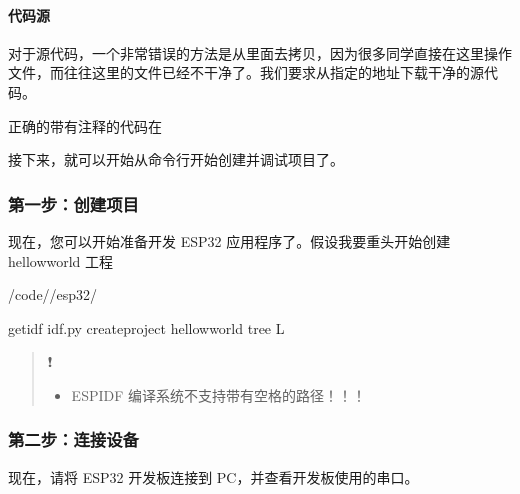 \documentclass[a4paper,12pt,english]{sphinxmanual}
\begin{document}
\paragraph{代码源}
\label{\detokenize{exp-esp32/ide/esp-idf-cli:id4}}
\sphinxAtStartPar
对于源代码，一个非常错误的方法是从里面去拷贝，因为很多同学直接在这里操作文件，而往往这里的文件已经不干净了。我们要求从指定的地址下载干净的源代码。

\sphinxAtStartPar
正确的带有注释的代码在 {\hyperref[\detokenize{reference::doc}]{}}

\sphinxAtStartPar
接下来，就可以开始从命令行开始创建并调试项目了。


\subsubsection{第一步：创建项目}
\label{\detokenize{exp-esp32/ide/esp-idf-cli:id5}}
\sphinxAtStartPar
现在，您可以开始准备开发 ESP32 应用程序了。假设我要重头开始创建 hellow\sphinxhyphen{}world 工程

\begin{sphinxVerbatim}[commandchars=\\\{\}]
 \PYGZti{}/code//esp32/

get\PYGZhy{}idf
idf.py create\PYGZhy{}project hellow\PYGZhy{}world
tree \PYGZhy{}L 
\end{sphinxVerbatim}
\begin{quote}

\sphinxAtStartPar
❗
\begin{itemize}
\item {} 
\sphinxAtStartPar
ESP\sphinxhyphen{}IDF 编译系统不支持带有空格的路径！！！

\end{itemize}
\end{quote}


\subsubsection{第二步：连接设备}
\label{\detokenize{exp-esp32/ide/esp-idf-cli:id6}}
\sphinxAtStartPar
现在，请将 ESP32 开发板连接到 PC，并查看开发板使用的串口。
\end{document}
